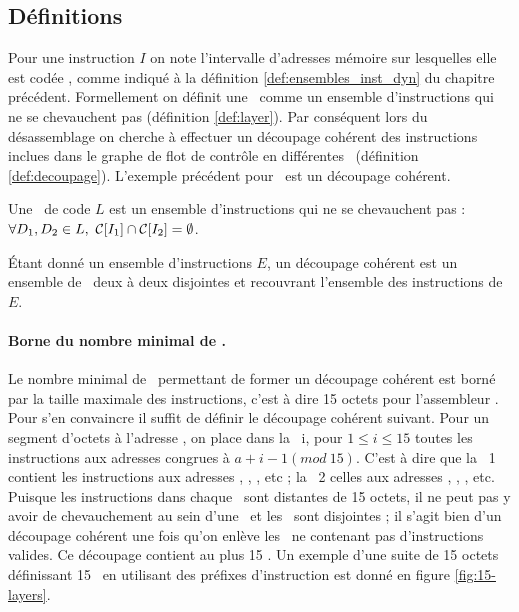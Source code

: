 \subsection{Définitions\label{sec:chevauchement_analyse_definitions}}

Pour une instruction $I$ on note l'intervalle d'adresses mémoire sur lesquelles elle est codée , comme indiqué à la définition \ref{def:ensembles_inst_dyn} du chapitre précédent.
Formellement on définit une \layer\ comme un ensemble d'instructions qui ne se chevauchent pas (définition \ref{def:layer}).
Par conséquent lors du désassemblage on cherche à effectuer un découpage cohérent des instructions inclues dans le graphe de flot de contrôle en différentes \layers\ (définition \ref{def:decoupage}).
L'exemple précédent pour \telock\ est un découpage cohérent.

\begin{defi}
 Une \layer\ de code $L$ est un ensemble d'instructions qui ne se chevauchent pas : $\forall D_1, D_2\in L,\ \mdc{I_1}\cap\mdc{I_2}=\emptyset$.
\label{def:layer}
\end{defi}

\begin{defi}
 Étant donné un ensemble d'instructions $E$, un découpage cohérent est un ensemble de \layers\ deux à deux disjointes et recouvrant l'ensemble des instructions de $E$.
\label{def:decoupage}
\end{defi}

\paragraph{Borne du nombre minimal de \layers.}
Le nombre minimal de \layers\ permettant de former un découpage cohérent est borné par la taille maximale des instructions, c'est à dire 15 octets pour l'assembleur \xq.
Pour s'en convaincre il suffit de définir le découpage cohérent suivant. Pour un segment d'octets à l'adresse , on place dans la \layer\ i, pour $1\leq i\leq 15$ toutes les instructions aux adresses congrues à $a+i-1 (mod\ 15)$. C'est à dire que la \layer\ 1 contient les instructions aux adresses , , , etc ; la \layer\ 2 celles aux adresses , , , etc. Puisque les instructions dans chaque \layer\ sont distantes de 15 octets, il ne peut pas y avoir de chevauchement au sein d'une \layer\ et les \layers\ sont disjointes ; il s'agit bien d'un découpage cohérent une fois qu'on enlève les \layers\ ne contenant pas d'instructions valides. Ce découpage contient au plus 15 \layers.
Un exemple d'une suite de 15 octets définissant 15 \layer\ en utilisant des préfixes d'instruction est donné en figure \ref{fig:15-layers}.

